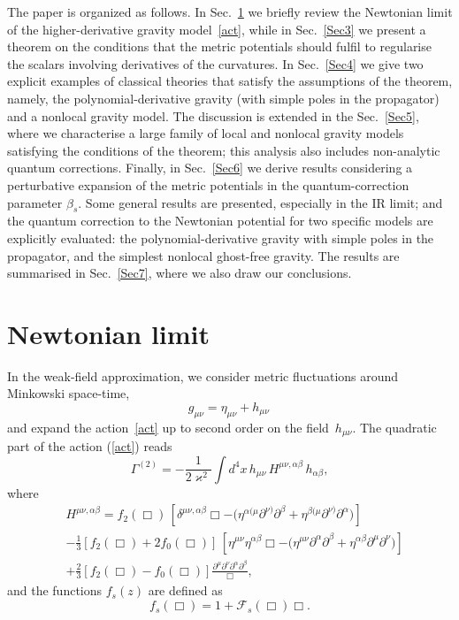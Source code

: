 \documentclass[aps,prd,a4paper,twocolumn,showpacs,showkeys,preprintnumbers,amsmath,amssymb,nofootinbib]{revtex4-2}
\renewcommand{\thesection}{\arabic{section}}
\numberwithin{equation}{section}
\let\oldsection\section%
\renewcommand{\section}{%
  \renewcommand{\theequation}{\thesection.\arabic{equation}}%
  \oldsection}%
\def\beq{\begin{equation}}
\def\eeq{\end{equation}}
\newcommand{\eq}[1]{(\ref{#1})}
\newcommand{\n}[1]{\label{#1}}
\def\al{\alpha}
\def\be{\beta}
\def\Ga{\Gamma}
\def\de{\delta}
\def\pa{\partial}
\begin{document}
The paper is organized as follows. In Sec.~\ref{Sec2} we briefly review the Newtonian limit of the higher-derivative gravity model~\eqref{act}, while in Sec.~\ref{Sec3} we present a theorem on the conditions that the metric potentials should fulfil to regularise the scalars involving derivatives of the curvatures. In Sec.~\ref{Sec4} we give two explicit examples of classical theories that satisfy the assumptions of the theorem, namely, the polynomial-derivative gravity (with simple poles in the propagator) and a nonlocal gravity model. The discussion is extended in the Sec.~\ref{Sec5}, where we characterise a large family of local and nonlocal gravity models satisfying the conditions of the theorem; this analysis also includes non-analytic quantum corrections. Finally, in Sec.~\ref{Sec6} we derive results considering a perturbative expansion of the metric potentials in the quantum-correction parameter $\be_s$. Some general results are presented, especially in the IR limit; and the quantum correction to the Newtonian potential for two specific models are explicitly evaluated: the polynomial-derivative gravity with simple poles in the propagator, and the simplest nonlocal ghost-free gravity. The results are summarised in Sec.~\ref{Sec7}, where we also draw our conclusions.




\section{Newtonian limit}
\label{Sec2}

In the weak-field approximation, we consider metric fluctuations around Minkowski space-time,
\beq
\n{mli}
g_{\mu\nu} = \eta_{\mu\nu} +  h_{\mu\nu}
\,
\eeq
and expand the action~\eqref{act} up to second order on the field~$h_{\mu\nu}$. 
The quadratic part of the action \eq{act} reads
\begin{equation}
\n{bili-EH}
\Ga^{(2)} 
= -\frac{1}{2 \varkappa^2 }  \int d^4x \, h_{\mu\nu} \, H^{\mu\nu,\al\be} \, h_{\al\be}
,
\end{equation}
where
\begin{equation}
\begin{split}
\n{He}
&
H^{\mu\nu,\al\be} =  
 f_2 (\Box) \, [\de^{\mu\nu,\al\be}  \Box
- \big(\eta^{\al(\mu} \pa^{\nu)} \pa^\be + \eta^{\be(\mu} \pa^{\nu)} \pa^\al \big)] 
\\
&
-  \frac13 [f_2 (\Box) + 2 f_0 (\Box)] \,  [\eta^{\mu\nu} \eta^{\al\be}  \Box  
-  \big( \eta^{\mu\nu} \pa^\al \pa^\be + \eta^{\al\be} \pa^\mu \pa^\nu \big)]
\\
& + \frac23 [f_2 (\Box) -  f_0 (\Box)] \frac{\pa^\mu \pa^\nu \pa^\al \pa^\be}{\Box}
,
\end{split}
\end{equation}
and the functions $f_s (z)$ are defined as
\beq \label{efizinho}
f_s (\Box) = 1 + \mathscr{F}_s (\Box) \Box
.
\eeq
\end{document}
